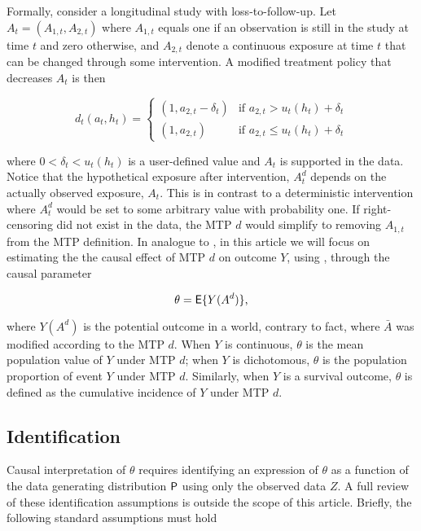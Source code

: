 \documentclass[]{jss}
\begin{document}
Formally, consider a longitudinal study with loss-to-follow-up. Let
\(A_t = (A_{1, t}, A_{2, t})\) where \(A_{1, t}\) equals one if an
observation is still in the study at time \(t\) and zero otherwise, and
\(A_{2, t}\) denote a continuous exposure at time \(t\) that can be
changed through some intervention. A modified treatment policy that
decreases \(A_t\) is then

\begin{equation}
d_t(a_t,h_t)=
\begin{cases}
(1, a_{2,t} - \delta_t) & \text{if } a_{2,t} > u_t(h_t) + \delta_t \\
(1, a_{2,t}) & \text{if } a_{2,t} \leq u_t(h_t) + \delta_t
\end{cases}
\end{equation}

where \(0 < \delta_t < u_t(h_t)\) is a user-defined value and \(A_t\) is
supported in the data. Notice that the hypothetical exposure after
intervention, \(A^{d}_t\) depends on the actually observed exposure,
\(A_t\). This is in contrast to a deterministic intervention where
\(A^{d}_t\) would be set to some arbitrary value with probability one.
If right-censoring did not exist in the data, the MTP \(d\) would
simplify to removing \(A_{1, t}\) from the MTP definition. In analogue
to \citet{diazNonparametricCausalEffects2020a}, in this article we will
focus on estimating the the causal effect of MTP \(d\) on outcome \(Y\),
using , through the causal parameter

\begin{equation}
\theta = \mathsf{E}\{Y(A^d)\}\text{,}
\end{equation}

where \(Y(A^d)\) is the potential outcome in a world, contrary to fact,
where \(\bar{A}\) was modified according to the MTP \(d\). When \(Y\) is
continuous, \(\theta\) is the mean population value of \(Y\) under MTP
\(d\); when \(Y\) is dichotomous, \(\theta\) is the population
proportion of event \(Y\) under MTP \(d\). Similarly, when \(Y\) is a
survival outcome, \(\theta\) is defined as the cumulative incidence of
\(Y\) under MTP \(d\).

\hypertarget{identification}{%
\subsection{Identification}\label{identification}}

Causal interpretation of \(\theta\) requires identifying an expression
of \(\theta\) as a function of the data generating distribution
\(\mathsf{P}\) using only the observed data \(Z\). A full review of these
identification assumptions is outside the scope of this article.
Briefly, the following standard assumptions must hold
\end{document}

